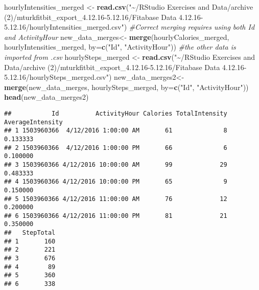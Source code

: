 \documentclass[
]{article}
\newenvironment{Shaded}{\begin{snugshade}}{\end{snugshade}}
\newcommand{\AttributeTok}[1]{\textcolor[rgb]{0.13,0.29,0.53}{#1}}
\newcommand{\CommentTok}[1]{\textcolor[rgb]{0.56,0.35,0.01}{\textit{#1}}}
\newcommand{\FunctionTok}[1]{\textcolor[rgb]{0.13,0.29,0.53}{\textbf{#1}}}
\newcommand{\NormalTok}[1]{#1}
\newcommand{\OtherTok}[1]{\textcolor[rgb]{0.56,0.35,0.01}{#1}}
\newcommand{\StringTok}[1]{\textcolor[rgb]{0.31,0.60,0.02}{#1}}
\begin{document}
\begin{Shaded}
\begin{Highlighting}[]
\NormalTok{hourlyIntensities\_merged }\OtherTok{\textless{}{-}} \FunctionTok{read.csv}\NormalTok{(}\StringTok{"\textasciitilde{}/RStudio Exercises and Data/archive (2)/mturkfitbit\_export\_4.12.16{-}5.12.16/Fitabase Data 4.12.16{-}5.12.16/hourlyIntensities\_merged.csv"}\NormalTok{)}
\CommentTok{\#Correct merging requires using both Id and ActivityHour}
\NormalTok{new\_data\_merges}\OtherTok{\textless{}{-}} \FunctionTok{merge}\NormalTok{(hourlyCalories\_merged, hourlyIntensities\_merged, }\AttributeTok{by=}\FunctionTok{c}\NormalTok{(}\StringTok{"Id"}\NormalTok{, }\StringTok{"ActivityHour"}\NormalTok{))}
\CommentTok{\#the other data is imported from .csv}
\NormalTok{hourlySteps\_merged }\OtherTok{\textless{}{-}} \FunctionTok{read.csv}\NormalTok{(}\StringTok{"\textasciitilde{}/RStudio Exercises and Data/archive (2)/mturkfitbit\_export\_4.12.16{-}5.12.16/Fitabase Data 4.12.16{-}5.12.16/hourlySteps\_merged.csv"}\NormalTok{)}
\NormalTok{new\_data\_merges2}\OtherTok{\textless{}{-}} \FunctionTok{merge}\NormalTok{(new\_data\_merges, hourlySteps\_merged, }\AttributeTok{by=}\FunctionTok{c}\NormalTok{(}\StringTok{"Id"}\NormalTok{, }\StringTok{"ActivityHour"}\NormalTok{))}
\FunctionTok{head}\NormalTok{(new\_data\_merges2)}
\end{Highlighting}
\end{Shaded}

\begin{verbatim}
##           Id          ActivityHour Calories TotalIntensity AverageIntensity
## 1 1503960366  4/12/2016 1:00:00 AM       61              8         0.133333
## 2 1503960366  4/12/2016 1:00:00 PM       66              6         0.100000
## 3 1503960366 4/12/2016 10:00:00 AM       99             29         0.483333
## 4 1503960366 4/12/2016 10:00:00 PM       65              9         0.150000
## 5 1503960366 4/12/2016 11:00:00 AM       76             12         0.200000
## 6 1503960366 4/12/2016 11:00:00 PM       81             21         0.350000
##   StepTotal
## 1       160
## 2       221
## 3       676
## 4        89
## 5       360
## 6       338
\end{verbatim}
\end{document}
